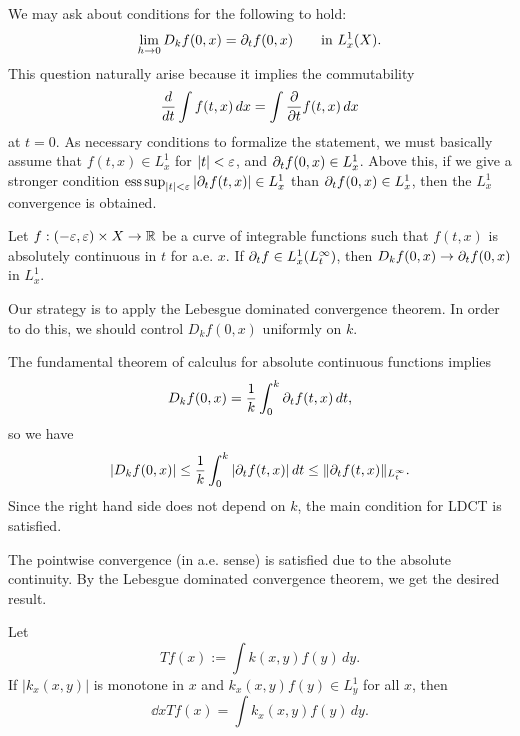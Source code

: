 \documentclass{../exp}
\begin{document}
We may ask about conditions for the following to hold:
\[\lim_{h\to0}D_kf(0,x)=\pd_tf(0,x)\qquad\text{in }L_x^1(X).\]
This question naturally arise because it implies the commutability
\[\dd{t}\int f(t,x)\,dx=\int\pd{t}f(t,x)\,dx\]
at $t=0$.
As necessary conditions to formalize the statement, we must basically assume that $f(t,x)\in L_x^1$ for $|t|<\varepsilon$, and $\pd_tf(0,x)\in L_x^1$.
Above this, if we give a stronger condition $\esssup_{|t|<\e}|\pd_tf(t,x)|\in L_x^1$ than $\pd_tf(0,x)\in L_x^1$, then the $L_x^1$ convergence is obtained.


\begin{thm}
Let $f:(-\e,\e)\times X\to\R$ be a curve of integrable functions such that $f(t,x)$ is absolutely continuous in $t$ for a.e. $x$.
If $\pd_tf\in L_x^1(L_t^\infty)$, then $D_kf(0,x)\to\pd_tf(0,x)$ in $L_x^1$.
\end{thm}
\begin{pf}
Our strategy is to apply the Lebesgue dominated convergence theorem.
In order to do this, we should control $D_kf(0,x)$ uniformly on $k$.

The fundamental theorem of calculus for absolute continuous functions implies
\[D_kf(0,x)=\frac1k\int_0^k\pd_tf(t,x)\,dt,\]
so we have
\[|D_kf(0,x)|\le\frac1k\int_0^k|\pd_tf(t,x)|\,dt\le\|\pd_tf(t,x)\|_{L_t^\infty}.\]
Since the right hand side does not depend on $k$, the main condition for LDCT is satisfied.

The pointwise convergence (in a.e. sense) is satisfied due to the absolute continuity.
By the Lebesgue dominated convergence theorem, we get the desired result.
\end{pf}
\begin{cor}
Let
\[Tf(x):=\int k(x,y)f(y)\,dy.\]
If $|k_x(x,y)|$ is monotone in $x$ and $k_x(x,y)f(y)\in L_y^1$ for all $x$, then
\[\dd{x}Tf(x)=\int k_x(x,y)f(y)\,dy.\]
\end{cor}
\end{document}
